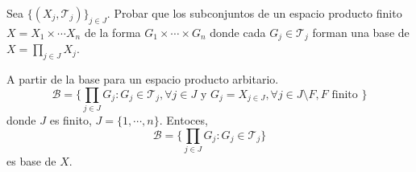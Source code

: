 \begin{ejr}[37]
  Sea $\{ ( X_{j}, \mathcal{T}_{j} ) \}_{j \in J}$. Probar que los subconjuntos de un espacio producto finito $X = X_{1} \times \cdots X_{n}$ de la forma $G_{1} \times \cdots \times G_{n}$ donde cada $G_{j} \in \mathcal{T}_{j}$ forman una base de $X = \prod_{j \in J} X_{j}$.
\end{ejr}

\begin{sol}
  A partir de la base para un espacio producto arbitario.
  \[ 
    \mathcal{B} = \{ \prod_{j \in J} G_{j} : G_{j} \in \mathcal{T}_{j}, \forall j \in J \text{ y } G_{j} = X_{j \in J}, \forall j \in J \setminus F, F \text{ finito }  \} 
  \] 
  donde $J$ es finito, $J = \{ 1, \cdots, n \}$. Entoces,
  \[ 
    \mathcal{B} = \{ \prod_{j \in J} G_{j} : G_{j} \in \mathcal{T}_{j} \} 
  \] 
  es base de $X$.
\end{sol}
